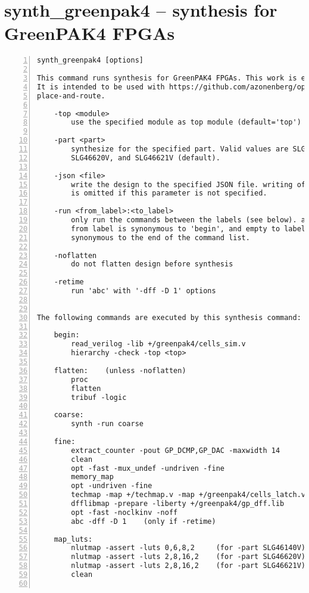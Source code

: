 \section{synth\_greenpak4 -- synthesis for GreenPAK4 FPGAs}
\label{cmd:synth_greenpak4}
\begin{lstlisting}[numbers=left,frame=single]
    synth_greenpak4 [options]

This command runs synthesis for GreenPAK4 FPGAs. This work is experimental.
It is intended to be used with https://github.com/azonenberg/openfpga as the
place-and-route.

    -top <module>
        use the specified module as top module (default='top')

    -part <part>
        synthesize for the specified part. Valid values are SLG46140V,
        SLG46620V, and SLG46621V (default).

    -json <file>
        write the design to the specified JSON file. writing of an output file
        is omitted if this parameter is not specified.

    -run <from_label>:<to_label>
        only run the commands between the labels (see below). an empty
        from label is synonymous to 'begin', and empty to label is
        synonymous to the end of the command list.

    -noflatten
        do not flatten design before synthesis

    -retime
        run 'abc' with '-dff -D 1' options


The following commands are executed by this synthesis command:

    begin:
        read_verilog -lib +/greenpak4/cells_sim.v
        hierarchy -check -top <top>

    flatten:    (unless -noflatten)
        proc
        flatten
        tribuf -logic

    coarse:
        synth -run coarse

    fine:
        extract_counter -pout GP_DCMP,GP_DAC -maxwidth 14
        clean
        opt -fast -mux_undef -undriven -fine
        memory_map
        opt -undriven -fine
        techmap -map +/techmap.v -map +/greenpak4/cells_latch.v
        dfflibmap -prepare -liberty +/greenpak4/gp_dff.lib
        opt -fast -noclkinv -noff
        abc -dff -D 1    (only if -retime)

    map_luts:
        nlutmap -assert -luts 0,6,8,2     (for -part SLG46140V)
        nlutmap -assert -luts 2,8,16,2    (for -part SLG46620V)
        nlutmap -assert -luts 2,8,16,2    (for -part SLG46621V)
        clean


\end{lstlisting}
